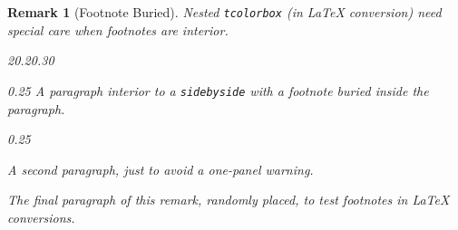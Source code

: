 \documentclass{sn-jnl}
\theoremstyle{thmstyleone}%
\theoremstyle{thmstyletwo}%
\theoremstyle{thmstylethree}%
\newtheorem{remark}[theorem]{Remark}
\newcommand{\mono}[1]{\texttt{#1}}
\numberwithin{equation}{section}
\begin{document}
\begin{remark}[Footnote Buried]\label{section-graphics-3-7}%
%
Nested \mono{tcolorbox} (in \LaTeX{} conversion) need special care when footnotes are interior.%
\begin{sidebyside}{2}{0.2}{0.3}{0}%
\begin{sbspanel}{0.25}%
A paragraph interior to a \mono{sidebyside} with a footnote\footnotemark{} buried inside the paragraph.%
\end{sbspanel}%
\begin{sbspanel}{0.25}%
\par
A second paragraph, just to avoid a one-panel warning.%
\end{sbspanel}%
\end{sidebyside}%
\par
The final paragraph of this remark, randomly placed, to test footnotes in \LaTeX{} conversions.%
\end{remark}
%
%
%
\typeout{************************************************}
\typeout{************************************************}
%
\end{document}
